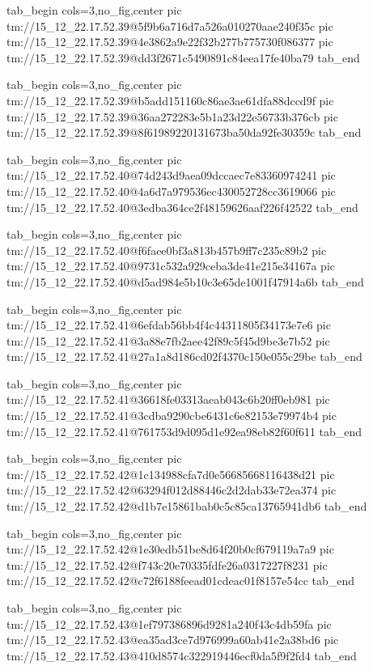  
 
 
 
 

\qqSecCmtScr


\ifcmt
  tab_begin cols=3,no_fig,center
    pic tm://15_12_22.17.52.39@5f9b6a716d7a526a010270aae240f35c
    pic tm://15_12_22.17.52.39@4e3862a9e22f32b277b775730f086377
    pic tm://15_12_22.17.52.39@dd3f2671c5490891c84eea17fe40ba79
  tab_end
\fi


\ifcmt
  tab_begin cols=3,no_fig,center
    pic tm://15_12_22.17.52.39@b5add151160c86ae3ae61dfa88dccd9f
    pic tm://15_12_22.17.52.39@36aa272283e5b1a23d22e56733b376cb
    pic tm://15_12_22.17.52.39@8f61989220131673ba50da92fe30359c
  tab_end
\fi


\ifcmt
  tab_begin cols=3,no_fig,center
    pic tm://15_12_22.17.52.40@74d243d9aea09dccaec7e83360974241
    pic tm://15_12_22.17.52.40@4a6d7a979536ec430052728cc3619066
    pic tm://15_12_22.17.52.40@3edba364ce2f48159626aaf226f42522
  tab_end
\fi


\ifcmt
  tab_begin cols=3,no_fig,center
    pic tm://15_12_22.17.52.40@f6faee0bf3a813b457b9ff7c235c89b2
    pic tm://15_12_22.17.52.40@9731c532a929ceba3de41e215e34167a
    pic tm://15_12_22.17.52.40@d5ad984e5b10c3e65de1001f47914a6b
  tab_end
\fi


\ifcmt
  tab_begin cols=3,no_fig,center
    pic tm://15_12_22.17.52.41@6efdab56bb4f4c44311805f34173e7e6
    pic tm://15_12_22.17.52.41@3a88e7fb2aee42f89c5f45d9be3e7b52
    pic tm://15_12_22.17.52.41@27a1a8d186cd02f4370c150e055c29be
  tab_end
\fi


\ifcmt
  tab_begin cols=3,no_fig,center
    pic tm://15_12_22.17.52.41@36618fe03313aeab043c6b20ff0eb981
    pic tm://15_12_22.17.52.41@3cdba9290cbe6431c6e82153e79974b4
    pic tm://15_12_22.17.52.41@761753d9d095d1e92ea98eb82f60f611
  tab_end
\fi


\ifcmt
  tab_begin cols=3,no_fig,center
    pic tm://15_12_22.17.52.42@1c134988cfa7d0e56685668116438d21
    pic tm://15_12_22.17.52.42@63294f012d88446c2d2dab33e72ea374
    pic tm://15_12_22.17.52.42@d1b7e15861bab0c5c85ca13765941db6
  tab_end
\fi


\ifcmt
  tab_begin cols=3,no_fig,center
    pic tm://15_12_22.17.52.42@1e30edb51be8d64f20b0cf679119a7a9
    pic tm://15_12_22.17.52.42@f743c20e70335fdfe26a0317227f8231
    pic tm://15_12_22.17.52.42@c72f6188feead01cdeac01f8157e54cc
  tab_end
\fi


\ifcmt
  tab_begin cols=3,no_fig,center
    pic tm://15_12_22.17.52.43@1ef797386896d9281a240f43c4db59fa
    pic tm://15_12_22.17.52.43@ea35ad3ce7d976999a60ab41e2a38bd6
    pic tm://15_12_22.17.52.43@410d8574c322919446ecf0da5f9f2fd4
  tab_end
\fi

